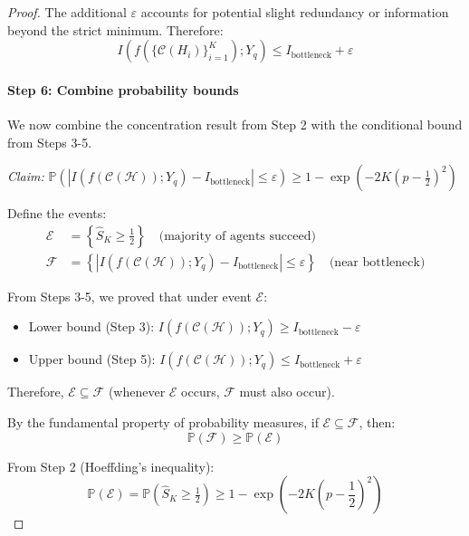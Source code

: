 \documentclass{article}
\theoremstyle{plain}
\theoremstyle{definition}
\theoremstyle{remark}
\begin{document}
\begin{proof}
The additional $\varepsilon$ accounts for potential slight redundancy or information beyond the strict minimum. Therefore:
\begin{equation}
I(f(\{\mathcal{C}(H_i)\}_{i=1}^K); Y_q) \leq I_{\text{bottleneck}} + \varepsilon \label{eq:upper_bound}
\end{equation}


\paragraph{Step 6: Combine probability bounds }

We now combine the concentration result from Step 2 with the conditional bound from Steps 3-5.

\textit{Claim:} $\mathbb{P}(|I(f(\mathcal{C}(\mathcal{H})); Y_q) - I_{\text{bottleneck}}| \leq \varepsilon) \geq 1 - \exp(-2K(p - \frac{1}{2})^2)$

 Define the events:
\begin{align}
\mathcal{E} &= \left\{\hat{S}_K \geq \frac{1}{2}\right\} \quad \text{(majority of agents succeed)} \\
\mathcal{F} &= \left\{|I(f(\mathcal{C}(\mathcal{H})); Y_q) - I_{\text{bottleneck}}| \leq \varepsilon\right\} \quad \text{(near bottleneck)}
\end{align}

From Steps 3-5, we proved that under event $\mathcal{E}$:
\begin{itemize}
    \item Lower bound (Step 3): $I(f(\mathcal{C}(\mathcal{H})); Y_q) \geq I_{\text{bottleneck}} - \varepsilon$
    \item Upper bound (Step 5): $I(f(\mathcal{C}(\mathcal{H})); Y_q) \leq I_{\text{bottleneck}} + \varepsilon$
\end{itemize}

Therefore, $\mathcal{E} \subseteq \mathcal{F}$ (whenever $\mathcal{E}$ occurs, $\mathcal{F}$ must also occur).

By the fundamental property of probability measures, if $\mathcal{E} \subseteq \mathcal{F}$, then:
\begin{equation}
\mathbb{P}(\mathcal{F}) \geq \mathbb{P}(\mathcal{E})
\end{equation}

From Step 2 (Hoeffding's inequality):
\begin{equation}
\mathbb{P}(\mathcal{E}) = \mathbb{P}(\hat{S}_K \geq \tfrac{1}{2}) \geq 1 - \exp\left(-2K\left(p - \frac{1}{2}\right)^2\right)
\end{equation}


\end{proof}
\end{document}
